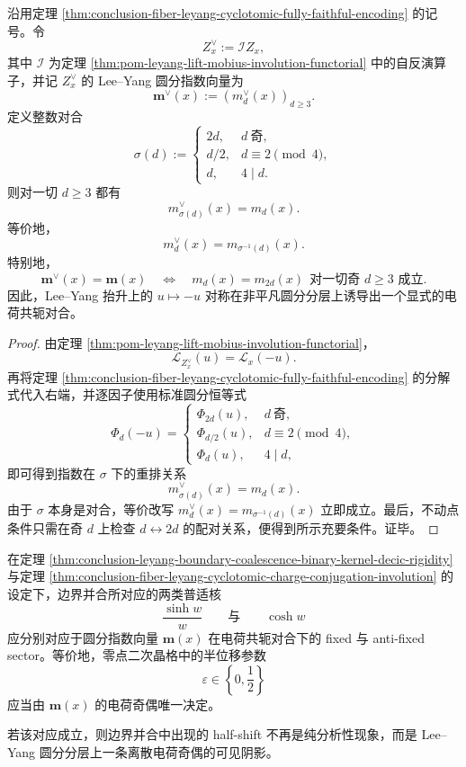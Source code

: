\begin{theorem}\label{thm:conclusion-fiber-leyang-cyclotomic-charge-conjugation-involution}
沿用定理 \ref{thm:conclusion-fiber-leyang-cyclotomic-fully-faithful-encoding} 的记号。令
\[
Z_x^\vee:=\mathcal I Z_x,
\]
其中 \(\mathcal I\) 为定理 \ref{thm:pom-leyang-lift-mobius-involution-functorial} 中的自反演算子，并记 \(Z_x^\vee\) 的 Lee--Yang 圆分指数向量为
\[
\mathbf m^\vee(x):=(m_d^\vee(x))_{d\ge 3}.
\]
定义整数对合
\[
\sigma(d):=
\begin{cases}
2d,& d\ \text{奇},\\[1mm]
d/2,& d\equiv 2\pmod 4,\\[1mm]
d,& 4\mid d.
\end{cases}
\]
则对一切 \(d\ge 3\) 都有
\[
m^\vee_{\sigma(d)}(x)=m_d(x).
\]
等价地，
\[
m_d^\vee(x)=m_{\sigma^{-1}(d)}(x).
\]
特别地，
\[
\mathbf m^\vee(x)=\mathbf m(x)
\quad\Longleftrightarrow\quad
m_d(x)=m_{2d}(x)\ \ \text{对一切奇 }d\ge 3\text{ 成立}.
\]
因此，Lee--Yang 抬升上的 \(u\mapsto -u\) 对称在非平凡圆分分层上诱导出一个显式的电荷共轭对合。
\end{theorem}
\begin{proof}
由定理 \ref{thm:pom-leyang-lift-mobius-involution-functorial}，
\[
\mathcal L_{Z_x^\vee}(u)=\mathcal L_x(-u).
\]
再将定理 \ref{thm:conclusion-fiber-leyang-cyclotomic-fully-faithful-encoding} 的分解式代入右端，并逐因子使用标准圆分恒等式
\[
\Phi_d(-u)=
\begin{cases}
\Phi_{2d}(u),& d\ \text{奇},\\[1mm]
\Phi_{d/2}(u),& d\equiv 2\pmod 4,\\[1mm]
\Phi_d(u),& 4\mid d,
\end{cases}
\]
即可得到指数在 \(\sigma\) 下的重排关系
\[
m^\vee_{\sigma(d)}(x)=m_d(x).
\]
由于 \(\sigma\) 本身是对合，等价改写
\(
m_d^\vee(x)=m_{\sigma^{-1}(d)}(x)
\)
立即成立。最后，不动点条件只需在奇 \(d\) 上检查 \(d\leftrightarrow 2d\) 的配对关系，便得到所示充要条件。证毕。
\end{proof}

\begin{conjecture}[边界并合半晶格位移与圆分电荷奇偶的对应]\label{conj:conclusion-leyang-boundary-halfshift-cyclotomic-parity-duality}
在定理 \ref{thm:conclusion-leyang-boundary-coalescence-binary-kernel-decic-rigidity} 与定理 \ref{thm:conclusion-fiber-leyang-cyclotomic-charge-conjugation-involution} 的设定下，边界并合所对应的两类普适核
\[
\frac{\sinh w}{w}
\qquad\text{与}\qquad
\cosh w
\]
应分别对应于圆分指数向量 \(\mathbf m(x)\) 在电荷共轭对合下的 fixed 与 anti-fixed sector。等价地，零点二次晶格中的半位移参数
\[
\varepsilon\in\left\{0,\frac12\right\}
\]
应当由 \(\mathbf m(x)\) 的电荷奇偶唯一决定。

若该对应成立，则边界并合中出现的 half-shift 不再是纯分析性现象，而是 Lee--Yang 圆分分层上一条离散电荷奇偶的可见阴影。
\end{conjecture}
